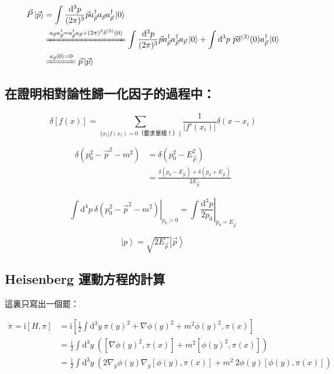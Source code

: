 \documentclass{article}
\begin{document}
$$\begin{aligned}
    \vec{P}\left|\vec{p}\right\rangle & =\int\frac{\mathrm{d}^3p}{(2\pi)^3}\vec{p}a_{\vec{p}}^{\dagger}a_{\vec{p}}a_{\vec{p}}^{\dagger}\left|0\right\rangle                                                                                                                                                                                         \\
                                      & \xlongequal{a_{\vec{p}}a_{\vec{p}}^{\dagger}=a_{\vec{p}}^{\dagger}a_{\vec{p}}+(2\pi)^3\delta^{(3)}(0)}\int\frac{\mathrm{d}^3p}{(2\pi)^3}\vec{p}a_{\vec{p}}^{\dagger}a_{\vec{p}}^{\dagger}a_{\vec{p}}\left|0\right\rangle+\int\mathrm{d}^3p\ \vec{p}\delta^{(3)}(0)a_{\vec{p}}^{\dagger}\left|0\right\rangle \\
                                      & \xlongequal{a_{\vec{p}}\left|0\right\rangle=0}\vec{p}\left|\vec{p}\right\rangle
  \end{aligned}$$

\subsection{在證明相對論性歸一化因子的過程中：}

$$\delta[f(x)]=\sum_{\{x_i|f(x_i)=0\text{（要求單根！）}\}}\frac{1}{|f'(x_i)|}\delta(x-x_i)$$

$$\begin{aligned}
    \delta(p_0^2-\vec{p}^2-m^2) & =\delta(p_0^2-E_{\vec{p}}^2)                                          \\
                                & =\frac{\delta(p_0-E_{\vec{p}})+\delta(p_0+E_{\vec{p}})}{2E_{\vec{p}}}
  \end{aligned}$$

$$\left.\int\mathrm{d}^4p\ \delta(p_0^2-\vec{p}^2-m^2)\right|_{p_0>0}=\left.\int\frac{\mathrm{d}^3p}{2p_0}\right|_{p_0=E_{\vec{p}}}$$

$$\left|p\right\rangle=\sqrt{2E_{\vec{p}}}\left|\vec{p}\right\rangle$$

\subsection{Heisenberg 運動方程的計算}

這裏只寫出一個罷：

$$\begin{aligned}
    \dot{\pi}=\mathrm{i}[H,\pi] & =\mathrm{i}\left[\frac{1}{2}\int\mathrm{d}^3y\ \pi(y)^2+\nabla\phi(y)^2+m^2\phi(y)^2,\pi(x)\right]                          \\
                                & =\frac{\mathrm{i}}{2}\int\mathrm{d}^3y\ \left([\nabla\phi(y)^2,\pi(x)]+m^2[\phi(y)^2,\pi(x)]\right)                         \\
                                & =\frac{\mathrm{i}}{2}\int\mathrm{d}^3y\ \left(2\nabla_y\phi(y)\nabla_y[\phi(y),\pi(x)]+m^2\ 2\phi(y)[\phi(y),\pi(x)]\right)
  \end{aligned}$$
\end{document}
